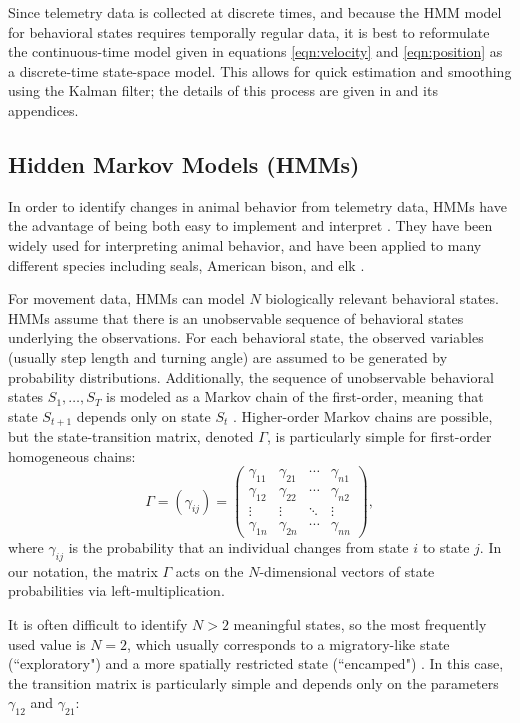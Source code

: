 \documentclass[12pt]{article}
\begin{document}
	Since telemetry data is collected at discrete times, and because the HMM model for behavioral states requires temporally regular data, it is best to reformulate the continuous-time model given in equations \eqref{eqn:velocity} and \eqref{eqn:position} as a discrete-time state-space model. This allows for quick estimation and smoothing using the Kalman filter; the details of this process are given in \cite{Johnson2008} and its appendices.
	
	\subsection{Hidden Markov Models (HMMs)}
	
	In order to identify changes in animal behavior from telemetry data, HMMs have the advantage of being both easy to implement and interpret \cite{McClintock2018}. They have been widely used for interpreting animal behavior, and have been applied to many different species including seals, American bison, and elk \cite{Jonsen2005, McClintock2012, Morales2004}.
	
	For movement data, HMMs can model $N$ biologically relevant behavioral states. HMMs assume that there is an unobservable sequence of behavioral states underlying the observations. For each behavioral state, the observed variables (usually step length and turning angle) are assumed to be generated by probability distributions. Additionally, the sequence of unobservable behavioral states $S_1, \ldots, S_T$ is modeled as a Markov chain of the first-order, meaning that state $S_{t + 1}$ depends only on state $S_t$ \cite{Langrock2012}. Higher-order Markov chains are possible, but the state-transition matrix, denoted $\Gamma$, is particularly simple for first-order homogeneous chains:
	\[\Gamma = (\gamma_{ij}) = \begin{pmatrix} \gamma_{11} & \gamma_{21} & \cdots & \gamma_{n1} \\ \gamma_{12} & \gamma_{22} & \cdots & \gamma_{n2} \\ \vdots & \vdots & \ddots & \vdots \\ \gamma_{1n} & \gamma_{2n} &\cdots & \gamma_{nn} \end{pmatrix},\]
	where $\gamma_{ij}$ is the probability that an individual changes from state $i$ to state $j$. In our notation, the matrix $\Gamma$ acts on the $N$-dimensional vectors of state probabilities via left-multiplication.
	
	It is often difficult to identify $N > 2$ meaningful states, so the most frequently used value is $N = 2$, which usually corresponds to a migratory-like state (``exploratory") and a more spatially restricted state (``encamped") \cite{McClintock2018}. In this case, the transition matrix is particularly simple and depends only on the parameters $\gamma_{12}$ and $\gamma_{21}$:
	
\end{document}
